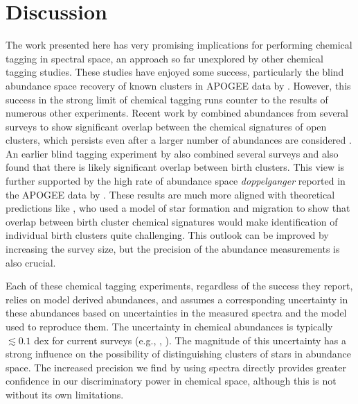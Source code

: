 \documentclass[a4paper,fleqn,usenatbib]{mnras}
\begin{document}
\section{Discussion}
\label{sec:discussion}

The work presented here has very promising implications for performing chemical tagging in spectral space, an approach so far unexplored by other chemical tagging studies. These studies have enjoyed some success, particularly the blind abundance space recovery of known clusters in APOGEE data by \citet{Hogg2016}. However, this success in the strong limit of chemical tagging runs counter to the results of numerous other experiments. Recent work by \citet{Blanco-Cuaresma2015} combined abundances from several surveys to show significant overlap between the chemical signatures of open clusters, which persists even after a larger number of abundances are considered \citep{Blanco-Cuaresma2016}. An earlier blind tagging experiment by \citet{Mitschang2014} also combined several surveys and also found that there is likely significant overlap between birth clusters. This view is further supported by the high rate of abundance space \textit{doppelganger} reported in the APOGEE data by \citet{Ness2017}. These results are much more aligned with theoretical predictions like \citet{Ting2015a}, who used a model of star formation and migration to show that overlap between birth cluster chemical signatures would make identification of individual birth clusters quite challenging. This outlook can be improved by increasing the survey size, but the precision of the abundance measurements is also crucial.

Each of these chemical tagging experiments, regardless of the success they report, relies on model derived abundances, and assumes a corresponding uncertainty in these abundances based on uncertainties in the measured spectra and the model used to reproduce them. The uncertainty in chemical abundances is typically $\lesssim 0.1$ dex for current surveys (e.g., \citealt{Smiljanic2014}, \citealt{Holtzman2015}). The magnitude of this uncertainty has a strong influence on the possibility of distinguishing clusters of stars in abundance space. The increased precision we find by using spectra directly provides greater confidence in our discriminatory power in chemical space, although this is not without its own limitations.
\end{document}
